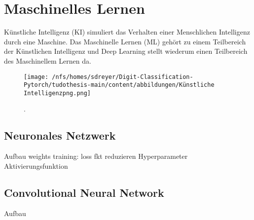 \section{Maschinelles Lernen}
Künstliche Intelligenz (KI) simuliert das Verhalten einer Menschlichen Intelligenz durch eine Maschine. 
Das Maschinelle Lernen (ML) gehört zu einem Teilbereich der Künstlichen Intelligenz und Deep Learning stellt 
wiederum einen Teilbereich des Maschinellem Lernen da.


\begin{figure}[htbp]
  \centering
  \texttt{[image: /nfs/homes/sdreyer/Digit-Classification-Pytorch/tudothesis-main/content/abbildungen/Künstliche Intelligenzpng.png]}
  \caption{.~\cite{kleesiek2020}}
  \label{fig:KI}
\end{figure}

\subsection{Neuronales Netzwerk}

Aufbau
    weights 
training: loss fkt reduzieren
Hyperparameter
Aktivierungsfunktion 
\subsection{Convolutional Neural Network}

Aufbau
